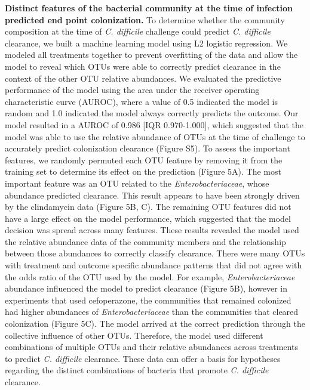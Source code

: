 \documentclass[11pt,]{article}
\begin{document}
\textbf{Distinct features of the bacterial community at the time of
infection predicted end point colonization.} To determine whether the
community composition at the time of \emph{C. difficile} challenge could
predict \emph{C. difficile} clearance, we built a machine learning model
using L2 logistic regression. We modeled all treatments together to
prevent overfitting of the data and allow the model to reveal which OTUs
were able to correctly predict clearance in the context of the other OTU
relative abundances. We evaluated the predictive performance of the
model using the area under the receiver operating characteristic curve
(AUROC), where a value of 0.5 indicated the model is random and 1.0
indicated the model always correctly predicts the outcome. Our model
resulted in a AUROC of 0.986 {[}IQR 0.970-1.000{]}, which suggested that
the model was able to use the relative abundance of OTUs at the time of
challenge to accurately predict colonization clearance (Figure S5). To
assess the important features, we randomly permuted each OTU feature by
removing it from the training set to determine its effect on the
prediction (Figure 5A). The most important feature was an OTU related to
the \emph{Enterobacteriaceae}, whose abundance predicted clearance. This
result appears to have been strongly driven by the clindamycin data
(Figure 5B, C). The remaining OTU features did not have a large effect
on the model performance, which suggested that the model decision was
spread across many features. These results revealed the model used the
relative abundance data of the community members and the relationship
between those abundances to correctly classify clearance. There were
many OTUs with treatment and outcome specific abundance patterns that
did not agree with the odds ratio of the OTU used by the model. For
example, \emph{Enterobacteriaceae} abundance influenced the model to
predict clearance (Figure 5B), however in experiments that used
cefoperazone, the communities that remained colonized had higher
abundances of \emph{Enterobacteriaceae} than the communities that
cleared colonization (Figure 5C). The model arrived at the correct
prediction through the collective influence of other OTUs. Therefore,
the model used different combinations of multiple OTUs and their
relative abundances across treatments to predict \emph{C. difficile}
clearance. These data can offer a basis for hypotheses regarding the
distinct combinations of bacteria that promote \emph{C. difficile}
clearance.
\end{document}
